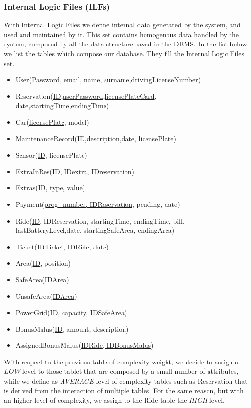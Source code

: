 \documentclass[10pt, a4paper,titlepage]{article}
\begin{document}
\subsubsection{Internal Logic Files (ILFs)}
With Internal Logic Files we define internal data generated by
the system, and used and maintained by it. This set contains homogenous data handled by the system, composed by all the data structure saved in the DBMS.
In the list below we list the tables which compose our database. They fill the Internal Logic Files set.
\begin{itemize}
\item User(\underline{Password}, email, name, surname,drivingLicenseNumber)
\item Reservation(\underline{ID,userPassword,licensePlateCard}, date,startingTime,endingTime)
\item Car(\underline{licensePlate}, model)
\item MaintenanceRecord(\underline{ID},description,date, licensePlate)
\item Sensor(\underline{ID}, licensePlate)
\item ExtraInRes(\underline{ID, IDextra, IDreservation})
\item Extras(\underline{ID}, type, value)
\item Payment(\underline{prog\_number, IDReservation}, pending, date)
\item Ride(\underline{ID}, IDReservation, startingTime, endingTime, bill, lastBatteryLevel,date, startingSafeArea, endingArea)
\item Ticket(\underline{IDTicket, IDRide}, date)
\item Area(\underline{ID}, position)
\item SafeArea(\underline{IDArea})
\item UnsafeArea(\underline{IDArea})
\item PowerGrid(\underline{ID}, capacity, IDSafeArea)
\item BonusMalus(\underline{ID}, amount, description)
\item AssignedBonusMalus(\underline{IDRide, IDBonusMalus})
\end{itemize}
With respect to the previous table of complexity weight, we decide to assign a \emph{LOW} level to those tablet that are composed by a small number of attributes, while we define as \emph{AVERAGE} level of complexity tables such as Reservation that is derived from the interaction of multiple tables. For the same reason, but with an higher level of complexity, we assign to the Ride table the \emph{HIGH} level.
\end{document}
